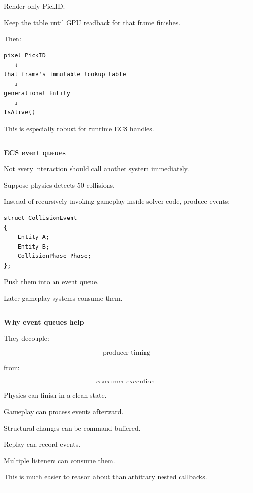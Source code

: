 Render only PickID.

Keep the table until GPU readback for that frame finishes.

Then:

\begin{verbatim}
pixel PickID
   ↓
that frame's immutable lookup table
   ↓
generational Entity
   ↓
IsAlive()
\end{verbatim}

This is especially robust for runtime ECS handles.

\begin{center}\rule{0.5\linewidth}{0.5pt}\end{center}

\textbf{ECS event queues}

Not every interaction should call another system immediately.

Suppose physics detects 50 collisions.

Instead of recursively invoking gameplay inside solver code, produce events:

\begin{verbatim}
struct CollisionEvent
{
    Entity A;
    Entity B;
    CollisionPhase Phase;
};
\end{verbatim}

Push them into an event queue.

Later gameplay systems consume them.

\begin{center}\rule{0.5\linewidth}{0.5pt}\end{center}

\textbf{Why event queues help}

They decouple:

\[
\text{producer timing}
\]

from:

\[
\text{consumer execution}.
\]

Physics can finish in a clean state.

Gameplay can process events afterward.

Structural changes can be command-buffered.

Replay can record events.

Multiple listeners can consume them.

This is much easier to reason about than arbitrary nested callbacks.

\begin{center}\rule{0.5\linewidth}{0.5pt}\end{center}

